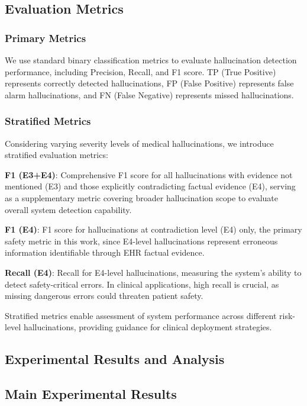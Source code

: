 \documentclass[11pt]{article}
\begin{document}
\subsection{Evaluation Metrics}

\subsubsection{Primary Metrics}

We use standard binary classification metrics to evaluate hallucination detection performance, including Precision, Recall, and F1 score. TP (True Positive) represents correctly detected hallucinations, FP (False Positive) represents false alarm hallucinations, and FN (False Negative) represents missed hallucinations.

\subsubsection{Stratified Metrics}

Considering varying severity levels of medical hallucinations, we introduce stratified evaluation metrics:

\textbf{F1 (E3+E4)}: Comprehensive F1 score for all hallucinations with evidence not mentioned (E3) and those explicitly contradicting factual evidence (E4), serving as a supplementary metric covering broader hallucination scope to evaluate overall system detection capability.

\textbf{F1 (E4)}: F1 score for hallucinations at contradiction level (E4) only, the primary safety metric in this work, since E4-level hallucinations represent erroneous information identifiable through EHR factual evidence.

\textbf{Recall (E4)}: Recall for E4-level hallucinations, measuring the system's ability to detect safety-critical errors. In clinical applications, high recall is crucial, as missing dangerous errors could threaten patient safety.

Stratified metrics enable assessment of system performance across different risk-level hallucinations, providing guidance for clinical deployment strategies.

\subsection{Experimental Results and Analysis}

\subsection{Main Experimental Results}
\end{document}
